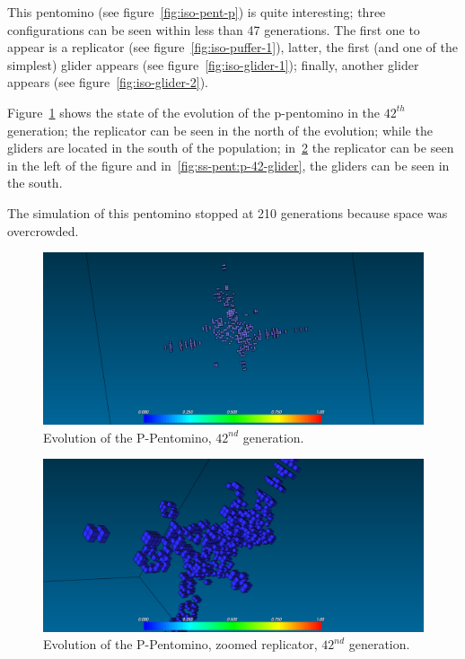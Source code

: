 This pentomino (see figure~\ref{fig:iso-pent-p}) is quite interesting; three
configurations can be seen within less than 47 generations. The first one to
appear is a replicator (see figure~\ref{fig:iso-puffer-1}), latter, the first
(and one of the simplest) glider appears (see figure~\ref{fig:iso-glider-1});
finally, another glider appears (see figure~\ref{fig:iso-glider-2}).

Figure~\ref{fig:ss-pent:p-42} shows the state of the evolution of the
p-pentomino in the $42^{th}$ generation; the replicator can be seen in the north
of the evolution; while the gliders are located in the south of the population;
in~\ref{fig:ss-pent:p-42-puffer} the replicator can be seen in the left of the
figure and in~\ref{fig:ss-pent:p-42-glider}, the gliders can be seen in the
south.

The simulation of this pentomino stopped at 210 generations because space
was overcrowded.

\begin{figure}[H]
	\centering
	\includegraphics[scale=0.3]{pentominoes_ss/p_42.png}
	\caption{Evolution of the P-Pentomino, $42^{nd}$ generation.}
  \label{fig:ss-pent:p-42}
\end{figure}

\begin{figure}[H]
	\centering
	\includegraphics[scale=0.3]{pentominoes_ss/p_42_puffer.png}
	\caption{Evolution of the P-Pentomino, zoomed replicator, $42^{nd}$
	generation.}
  \label{fig:ss-pent:p-42-puffer}
\end{figure}

